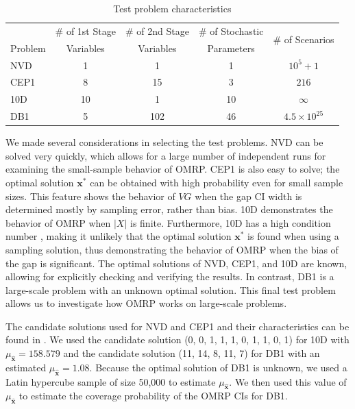 \documentclass[12pt]{article}
\newcommand{\x}{\mathbf{x}}
\newcommand{\xh}{{\hat{\x}}}
\newcommand{\xs}{\x^*}
\begin{document}
\begin{table}[thb]
\centering
\footnotesize
\begin{tabular}{lcccc}
\hline
& \# of 1st Stage & \# of 2nd Stage & \# of Stochastic & \multirow{2}{*}{\# of Scenarios} \\
Problem & Variables & Variables & Parameters & \\
\cmidrule(r){1-1} \cmidrule(l){2-5}
NVD 	& 1     	& 1     	& 1   	& $10^5 + 1$ \\
CEP1 	& 8     	& 15   	& 3   	& $216$ \\
10D 	& 10     & 1     	& 10   	& $\infty$ \\
DB1 	& 5   	& 102   	& 46   	& $4.5\times 10^{25}$ \\
\hline
\end{tabular}
\caption{Test problem characteristics}
\label{tb:test_problems}
\end{table}



We made several considerations in selecting the test problems.
NVD can be solved very quickly, which allows for a large number of independent runs for examining the small-sample behavior of OMRP.
CEP1 is also easy to solve; the optimal solution $\xs$ can be obtained with high probability even for small sample sizes.
This feature shows the behavior of $VG$ when the gap CI width is determined mostly by sampling error, rather than bias.
10D demonstrates the behavior of OMRP when $|X|$ is finite.
Furthermore, 10D has a high condition number \citep{kleywegt2002sample}, making it unlikely that the optimal solution $\xs$ is found when using a sampling solution, thus demonstrating the behavior of OMRP when the bias of the gap is significant.
The optimal solutions of NVD, CEP1, and 10D are known, allowing for explicitly checking and verifying the results.
In contrast, DB1 is a large-scale problem with an unknown optimal solution.
This final test problem allows us to investigate how OMRP works on large-scale problems.


The candidate solutions used for NVD and CEP1 and their characteristics can be found in \citep{Bayraksan2006}.
We used the candidate solution (0, 0, 1, 1, 1, 0, 1, 1, 0, 1) for 10D with $\mu_{\xh} = 158.579$ and the candidate solution (11, 14, 8, 11, 7) for DB1 with an estimated $\mu_{\xh} = 1.08$. 
Because the optimal solution of DB1 is unknown, we used a Latin hypercube sample of size 50,000 to estimate $\mu_{\xh}$.
We then used this value of $\mu_{\xh}$ to estimate the coverage probability of the OMRP CIs for DB1.
\end{document}
